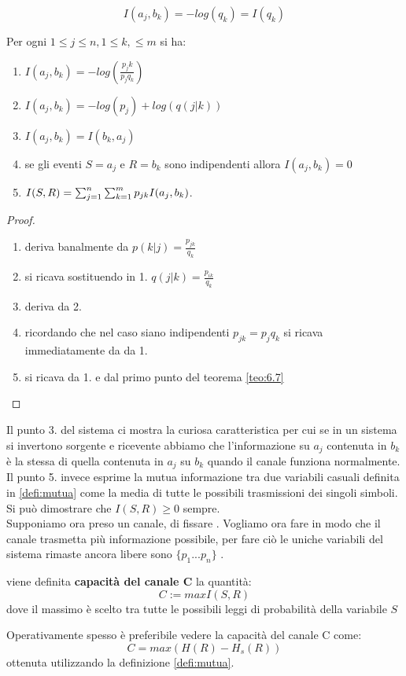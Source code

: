 $$I(a_j,b_k)=-log(q_k)=I(q_k)$$
\begin{teo}
Per ogni $1\leq j \leq n , 1 \leq k, \leq m$ si ha:
\begin{enumerate}
\item $I(a_j,b_k)=-log(\frac{p_jk}{p_j q_k})$
\item $I(a_j,b_k)=-log(p_j)+log(q(j|k))$
\item $I(a_j,b_k)=I(b_k,a_j)$
\item se gli eventi $S=a_j$ e $R=b_k$ sono indipendenti allora $I(a_j,b_k)=0$
\item $I(S,R)=\sum_{j=1}^n \sum_{k=1}^m p_{jk}I(a_j,b_k)$.
\end{enumerate}
\end{teo}
\begin{proof}
\begin{enumerate}
\item deriva banalmente da $p(k|j)=\frac{p_{jk}}{q_k}$
\item si ricava sostituendo in 1. $q(j|k)=\frac{p_{ik}}{q_k}$
\item deriva da 2.
\item ricordando che nel caso siano indipendenti $p_{jk}=p_jq_k$ si ricava immediatamente da da 1.
\item si ricava da 1. e dal primo punto del teorema \ref{teo:6.7}
\end{enumerate}
\end{proof}

Il punto 3. del sistema ci mostra la curiosa caratteristica per cui se in un sistema si invertono sorgente e ricevente abbiamo che l'informazione su $a_j$ contenuta in $b_k$ è la stessa di quella contenuta in $a_j$ su $b_k$ quando il canale funziona normalmente. Il punto 5. invece esprime la mutua informazione tra due variabili casuali definita in \ref{defi:mutua} come la media di tutte le possibili trasmissioni dei singoli simboli. Si può dimostrare che $I(S,R)\geq 0$ sempre.\\

Supponiamo ora preso un canale, di fissare \lepc . Vogliamo ora fare in modo che il canale trasmetta più informazione possibile, per fare ciò le uniche variabili del sistema rimaste ancora libere sono $\{p_1...p_n \}$ .
\begin{defi}
viene definita \textbf{capacità del canale C} la quantità:
\begin{equation}
C:=max I(S,R)
\end{equation}
dove il massimo è scelto tra tutte le possibili leggi di probabilità della variabile $S$
\end{defi}
Operativamente spesso è preferibile vedere la capacità del canale C come:
\begin{equation}
C=max(H(R)-H_s(R))
\end{equation}
ottenuta utilizzando la definizione \ref{defi:mutua}.

